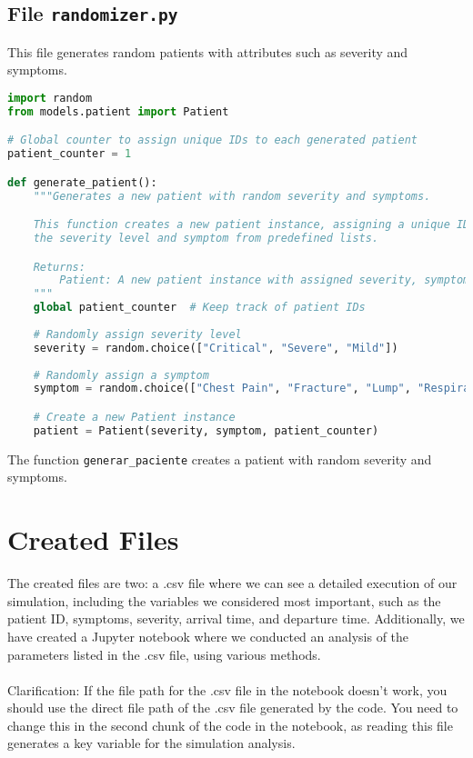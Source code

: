 \documentclass[a4paper,12pt]{article}
\begin{document}
\subsection{File \texttt{randomizer.py}}
This file generates random patients with attributes such as severity and symptoms.

\begin{lstlisting}[language=Python]
import random
from models.patient import Patient

# Global counter to assign unique IDs to each generated patient
patient_counter = 1

def generate_patient():
    """Generates a new patient with random severity and symptoms.

    This function creates a new patient instance, assigning a unique ID and randomly selecting 
    the severity level and symptom from predefined lists.

    Returns:
        Patient: A new patient instance with assigned severity, symptom, and unique ID.
    """
    global patient_counter  # Keep track of patient IDs
    
    # Randomly assign severity level
    severity = random.choice(["Critical", "Severe", "Mild"])
    
    # Randomly assign a symptom
    symptom = random.choice(["Chest Pain", "Fracture", "Lump", "Respiratory Difficulty", "Sore Throat"])

    # Create a new Patient instance
    patient = Patient(severity, symptom, patient_counter)

\end{lstlisting}

The function \texttt{generar\_paciente} creates a patient with random severity and symptoms.

\section{Created Files}
The created files are two: a .csv file where we can see a detailed execution of our simulation, including the variables we considered most important, such as the patient ID, symptoms, severity, arrival time, and departure time. Additionally, we have created a Jupyter notebook where we conducted an analysis of the parameters listed in the .csv file, using various methods.
\\ 
\\
Clarification: If the file path for the .csv file in the notebook doesn't work, you should use the direct file path of the .csv file generated by the code. You need to change this in the second chunk of the code in the notebook, as reading this file generates a key variable for the simulation analysis.
\end{document}
